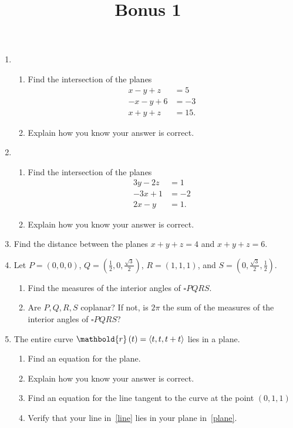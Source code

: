 \documentclass[12pt]{article}
\title{Bonus 1}
\author{}\date{}
\let\sin\relax\DeclareMathOperator{\sin}{\mathsf{sin}}
\let\cos\relax\DeclareMathOperator{\cos}{\mathsf{cos}}
\begin{document}
\maketitle
\thispagestyle{empty}

\begin{enumerate}

\item
\begin{enumerate}
\item Find the intersection of the planes
\begin{align*}
x-y+z&=5\\
-x-y+6&=-3\\
x+y+z&=15.
\end{align*}
\item Explain how you know your answer is correct.
\end{enumerate}

\item
\begin{enumerate}
\item Find the intersection of the planes
\begin{align*}
3y-2z&=1\\
-3x+1&=-2\\
2x-y&=1.
\end{align*}
\item Explain how you know your answer is correct.
\end{enumerate}

\item Find the distance between the planes
$x+y+z=4$ and $x+y+z=6$.

\item Let $P=\left(0,0,0\right)$,
$Q=\left(\frac{1}{2},0,\frac{\sqrt{3}}{2}\right)$,
$R=\left(1,1,1\right)$, and
$S=\left(0,\frac{\sqrt{3}}{2},\frac{1}{2}\right)$.
\begin{enumerate}
\item Find the measures of the interior angles
of $\square PQRS$.
\item Are $P,Q,R,S$ coplanar? If not, is $2\pi$ the
sum of the measures of the interior angles of
$\square PQRS$?
\end{enumerate}

\item
The entire curve $\mathbold{r}\left(t\right)
=\left\langle\cos{t},\sin{t},\cos{t}+\sin{t}\right\rangle$
lies in a plane.
\begin{enumerate}
\item\label{plane} Find an equation for the plane.
\item Explain how you know your answer is correct.
\item\label{line} Find an equation for the line tangent to the curve
at the point $\left(0,1,1\right)$
\item Verify that your line in~\autoref{line} lies in your plane
in~\autoref{plane}.
\end{enumerate}
\end{enumerate}
\end{document}

